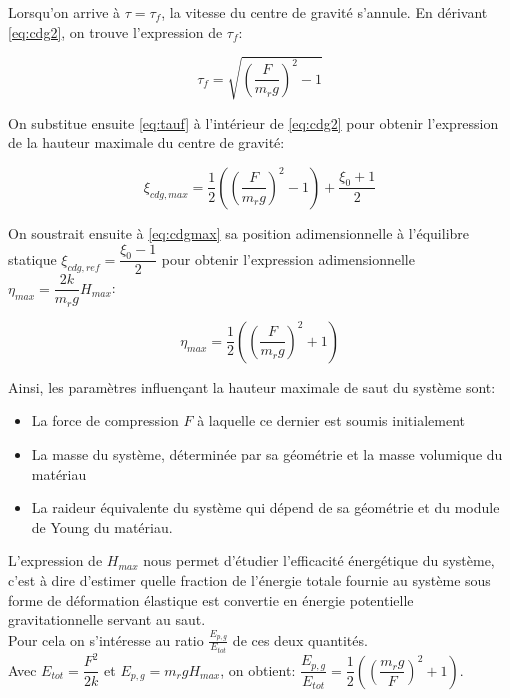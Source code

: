Lorsqu'on arrive à $\tau=\tau_f$, la vitesse du centre de gravité s'annule. En dérivant \ref{eq:cdg2}, on trouve l'expression de $\tau_f$:

\begin{equation}
    \tau_f=\sqrt{(\frac{F}{m_r g})^2-1}
    \label{eq:tauf}
\end{equation}

On substitue ensuite \ref{eq:tauf} à l'intérieur de \ref{eq:cdg2} pour obtenir l'expression de la hauteur maximale du centre de gravité:

\begin{equation}
  \xi_{cdg,max}=\frac{1}{2}((\frac{F}{m_r g})^2-1)+\frac{\xi_0+1}{2}
  \label{eq:cdgmax}
\end{equation}

On soustrait ensuite à \ref{eq:cdgmax} sa position adimensionnelle à l'équilibre statique $\xi_{cdg,ref}=\dfrac{\xi_0-1}{2}$ pour obtenir l'expression adimensionnelle $\eta_{max}=\dfrac{2k}{m_rg}H_{max}$:


\begin{equation}
\eta_{max}=\frac{1}{2}((\frac{F}{m_r g})^2+1)
 \label{eq:hmax}
\end{equation}


Ainsi, les paramètres influençant la hauteur maximale de saut du système sont:
\begin{itemize}
    \item La force de compression $F$ à laquelle ce dernier est soumis initialement
    \item La masse du système, déterminée par sa géométrie et la masse volumique du matériau
    \item La raideur équivalente du système qui dépend de sa géométrie et du module de Young du matériau.
\end{itemize}

L'expression de $H_{max}$ nous permet d'étudier l'efficacité énergétique du système, c'est à dire d'estimer quelle fraction de l'énergie totale fournie au système sous forme de déformation élastique est convertie en énergie potentielle gravitationnelle servant au saut. \\
Pour cela on s'intéresse au ratio $\frac{E_{p,g}}{E_{tot}}$ de ces deux quantités. \\
Avec $E_{tot}=\dfrac{F^2}{2k}$ et $E_{p,g}=m_r g H_{max}$, on obtient:  $\dfrac{E_{p,g}}{E_{tot}}=\dfrac{1}{2}((\dfrac{m_r g}{F})^2+1)$.

